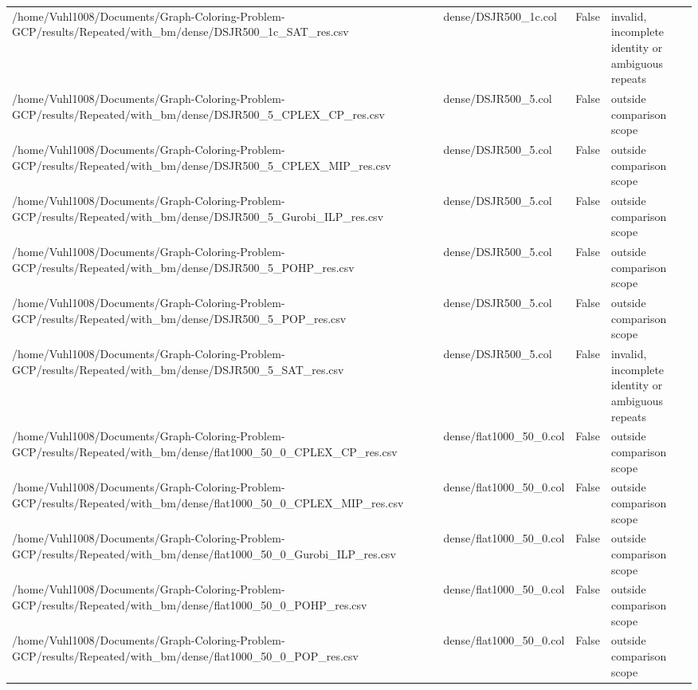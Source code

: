 \begin{table}[htbp]
\begin{tabular}{llll}
/home/Vuhl1008/Documents/Graph-Coloring-Problem-GCP/results/Repeated/with\_bm/dense/DSJR500\_1c\_SAT\_res.csv & dense/DSJR500\_1c.col & False & invalid, incomplete identity or ambiguous repeats \\
/home/Vuhl1008/Documents/Graph-Coloring-Problem-GCP/results/Repeated/with\_bm/dense/DSJR500\_5\_CPLEX\_CP\_res.csv & dense/DSJR500\_5.col & False & outside comparison scope \\
/home/Vuhl1008/Documents/Graph-Coloring-Problem-GCP/results/Repeated/with\_bm/dense/DSJR500\_5\_CPLEX\_MIP\_res.csv & dense/DSJR500\_5.col & False & outside comparison scope \\
/home/Vuhl1008/Documents/Graph-Coloring-Problem-GCP/results/Repeated/with\_bm/dense/DSJR500\_5\_Gurobi\_ILP\_res.csv & dense/DSJR500\_5.col & False & outside comparison scope \\
/home/Vuhl1008/Documents/Graph-Coloring-Problem-GCP/results/Repeated/with\_bm/dense/DSJR500\_5\_POHP\_res.csv & dense/DSJR500\_5.col & False & outside comparison scope \\
/home/Vuhl1008/Documents/Graph-Coloring-Problem-GCP/results/Repeated/with\_bm/dense/DSJR500\_5\_POP\_res.csv & dense/DSJR500\_5.col & False & outside comparison scope \\
/home/Vuhl1008/Documents/Graph-Coloring-Problem-GCP/results/Repeated/with\_bm/dense/DSJR500\_5\_SAT\_res.csv & dense/DSJR500\_5.col & False & invalid, incomplete identity or ambiguous repeats \\
/home/Vuhl1008/Documents/Graph-Coloring-Problem-GCP/results/Repeated/with\_bm/dense/flat1000\_50\_0\_CPLEX\_CP\_res.csv & dense/flat1000\_50\_0.col & False & outside comparison scope \\
/home/Vuhl1008/Documents/Graph-Coloring-Problem-GCP/results/Repeated/with\_bm/dense/flat1000\_50\_0\_CPLEX\_MIP\_res.csv & dense/flat1000\_50\_0.col & False & outside comparison scope \\
/home/Vuhl1008/Documents/Graph-Coloring-Problem-GCP/results/Repeated/with\_bm/dense/flat1000\_50\_0\_Gurobi\_ILP\_res.csv & dense/flat1000\_50\_0.col & False & outside comparison scope \\
/home/Vuhl1008/Documents/Graph-Coloring-Problem-GCP/results/Repeated/with\_bm/dense/flat1000\_50\_0\_POHP\_res.csv & dense/flat1000\_50\_0.col & False & outside comparison scope \\
/home/Vuhl1008/Documents/Graph-Coloring-Problem-GCP/results/Repeated/with\_bm/dense/flat1000\_50\_0\_POP\_res.csv & dense/flat1000\_50\_0.col & False & outside comparison scope \\

\end{tabular}
\end{table}
